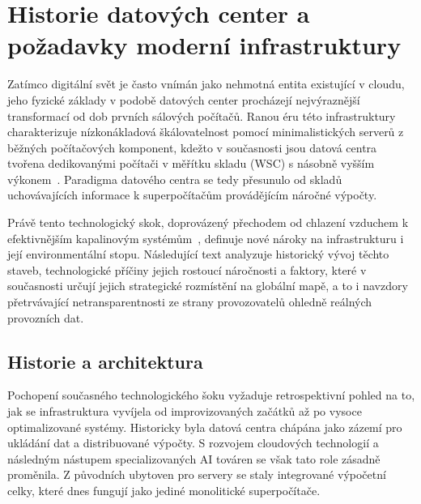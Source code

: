 \chapter{Historie datových center a požadavky moderní infrastruktury }

Zatímco digitální svět je často vnímán jako nehmotná entita existující v cloudu, jeho fyzické základy v podobě datových center procházejí nejvýraznější transformací od dob prvních sálových počítačů. Ranou éru této infrastruktury charakterizuje nízkonákladová škálovatelnost pomocí minimalistických serverů z běžných počítačových komponent, kdežto v současnosti jsou datová centra tvořena dedikovanými počítači v měřítku skladu (WSC) s násobně vyšším výkonem~\cite[kap.~11]{ranganathan_twenty_2024}. Paradigma datového centra se tedy přesunulo od skladů uchovávajících informace k superpočítačům provádějícím náročné výpočty.

Právě tento technologický skok, doprovázený přechodem od chlazení vzduchem k efektivnějším kapalinovým systémům~\cite{bizo_silicon_2022}, definuje nové nároky na infrastrukturu i její environmentální stopu. Následující text analyzuje historický vývoj těchto staveb, technologické příčiny jejich rostoucí náročnosti a faktory, které v současnosti určují jejich strategické rozmístění na globální mapě, a to i navzdory přetrvávající netransparentnosti ze strany provozovatelů ohledně reálných provozních dat.

\section{Historie a architektura}
\label{sec:historie}


Pochopení současného technologického šoku vyžaduje retrospektivní pohled na to, jak se infrastruktura vyvíjela od improvizovaných začátků až po vysoce optimalizované systémy. Historicky byla datová centra chápána jako zázemí pro ukládání dat a distribuované výpočty. S rozvojem cloudových technologií a následným nástupem specializovaných AI továren se však tato role zásadně proměnila. Z původních ubytoven pro servery se staly integrované výpočetní celky, které dnes fungují jako jediné monolitické superpočítače.

